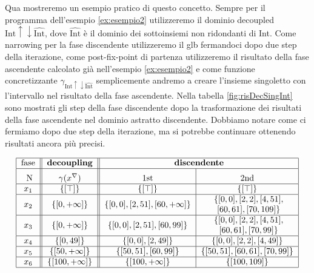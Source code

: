 \begin{example}
Qua mostreremo un esempio pratico di questo concetto. Sempre per il programma dell'esempio \ref{ex:esempio2} utilizzeremo il dominio decoupled \(\textrm{Int}\uparrow\downarrow\widehat{\textrm{Int}}\), dove \(\widehat{\textrm{Int}}\) è il dominio dei sottoinsiemi non ridondanti di Int. Come narrowing per la fase discendente utilizzeremo il glb fermandoci dopo due step della iterazione, come post-fix-point di partenza utilizzeremo il risultato della fase ascendente calcolato già nell'esempio \ref{ex:esempio2} e come funzione concretizzante \(\gamma_{\textrm{Int}\uparrow\downarrow\widehat{\textrm{Int}}}\) semplicemente andremo a creare l'insieme singoletto con l'intervallo nel risultato della fase ascendente. Nella tabella \ref{fig:risDecSingInt} sono mostrati gli step della fase discendente dopo la trasformazione dei risultati della fase ascendente nel dominio astratto discendente. Dobbiamo notare come ci fermiamo dopo due step della iterazione, ma si potrebbe continuare ottenendo risultati ancora più precisi. 

\begin{table}
\begin{minipage}{\textwidth}
    \centering
    \vspace{1cm}
        \[
        \begin{tabular}{|c||c||c|c|}
        \hline
        \multicolumn{1}{|c||}{fase} & 
        \multicolumn{1}{c||}{\textbf{decoupling}} & 
        \multicolumn{2}{c|}{\textbf{discendente}}\\
        
        \hline 
        \rule{0pt}{14pt} 
        N &  
        \(\gamma(x^{\nabla})\) & 
        1st & 2nd \\
        \hline
        $x_1$ & $\{\left[\top\right]\}$ 
        & $\{\left[\top\right]\}$ & $\{\left[\top\right]\}$ \\
        \hline
        $x_2$ & $\{\left[0, +\infty\right]\}$ 
        & $\{[0, 0], [2, 51], \left[60, +\infty\right]\}$  & \specialcell{$\{[0, 0], [2, 2], [4, 51],$\\$ [60, 61], [70, 109]\}$} \\
        \hline
        $x_3$ & $\{\left[0, +\infty\right]\}$ 
        & $\{[0, 0], [2, 51], [60, 99]\}$ & \specialcell{$\{[0, 0], [2, 2], [4, 51],$\\$[60, 61], [70, 99]\}$} \\
        \hline
        $x_4$ & $\{\left[0, 49\right]\}$ 
        & $\{[0, 0], [2, 49]\}$& $\{[0, 0], [2, 2], [4, 49]\}$ \\
        \hline
        $x_5$ & $\{\left[50, +\infty\right]\}$ 
        & $\{[50, 51], [60, 99]\}$& $\{[50, 51], [60, 61], [70, 99]\}$ \\
        \hline
        $x_6$ & $\{\left[100, +\infty\right]\}$
        & $\{[100, +\infty]\}$& $\{[100, 109]\}$ \\
        \hline
        \end{tabular}
        \]
    \end{minipage}
    \caption{tabella dei risultati del dominio \(\textrm{Sign}\uparrow\downarrow\textrm{Int}\) divisi per step e fase.}
    \label{fig:risDecSingInt}
\end{table}
\end{example}